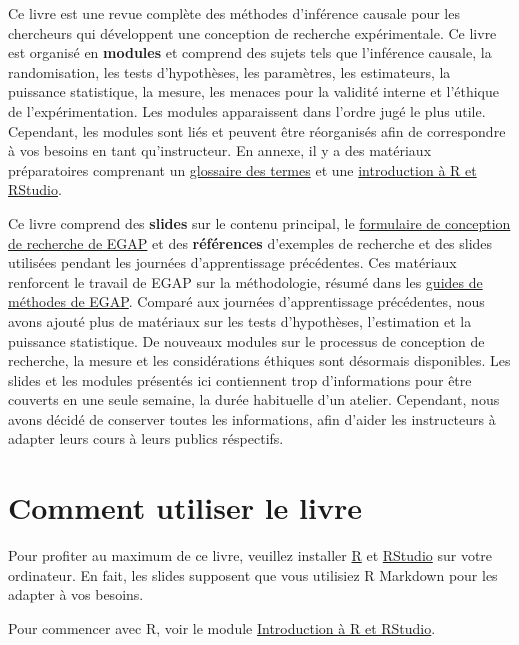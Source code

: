 \documentclass[
  12pt,
]{book}
\begin{document}
Ce livre est une revue complète des méthodes d'inférence causale pour les chercheurs qui développent une conception de recherche expérimentale. Ce livre est organisé en \textbf{modules} et comprend des sujets tels que l'inférence causale, la randomisation, les tests d'hypothèses, les paramètres, les estimateurs, la puissance statistique, la mesure, les menaces pour la validité interne et l'éthique de l'expérimentation. Les modules apparaissent dans l'ordre jugé le plus utile. Cependant, les modules sont liés et peuvent être réorganisés afin de correspondre à vos besoins en tant qu'instructeur. En annexe, il y a des matériaux préparatoires comprenant un \href{glossaire-des-termes.html}{glossaire des termes} et une \href{introduction-à-r-et-rstudio.html}{introduction à R et RStudio}.

Ce livre comprend des \textbf{slides} sur le contenu principal, le \href{researchdesignform.html}{formulaire de conception de recherche de EGAP} et des \textbf{références} d'exemples de recherche et des slides utilisées pendant les journées d'apprentissage précédentes. Ces matériaux renforcent le travail de EGAP sur la méthodologie, résumé dans les \href{https://egap.org/methods-guides/}{guides de méthodes de EGAP}. Comparé aux journées d'apprentissage précédentes, nous avons ajouté plus de matériaux sur les tests d'hypothèses, l'estimation et la puissance statistique. De nouveaux modules sur le processus de conception de recherche, la mesure et les considérations éthiques sont désormais disponibles. Les slides et les modules présentés ici contiennent trop d'informations pour être couverts en une seule semaine, la durée habituelle d'un atelier. Cependant, nous avons décidé de conserver toutes les informations, afin d'aider les instructeurs à adapter leurs cours à leurs publics réspectifs.

\hypertarget{comment-utiliser-le-livre}{%
\section{Comment utiliser le livre}\label{comment-utiliser-le-livre}}

Pour profiter au maximum de ce livre, veuillez installer \href{https://cran.r-project.org/}{R} et \href{https://www.rstudio.com/products/rstudio/download/}{RStudio} sur votre ordinateur. En fait, les slides supposent que vous utilisiez R Markdown pour les adapter à vos besoins.

Pour commencer avec R, voir le module \href{introduction-à-r-et-rstudio.html}{Introduction à R et RStudio}.
\end{document}
